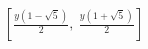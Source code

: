 \documentclass[preview]{standalone}
\begin{document}
\begin{align*}
\left[ \frac{y \left(1 - \sqrt{5}\right)}{2}, \  \frac{y \left(1 + \sqrt{5}\right)}{2}\right]
\end{align*}
\end{document}
